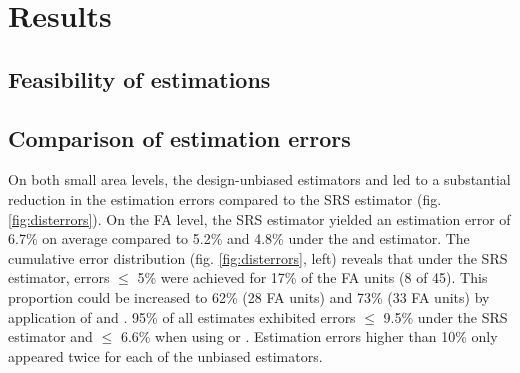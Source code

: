 \section{Results}
\label{sec:Res}

\subsection{Feasibility of estimations}
\label{sec:feasest}








%
%








\newpage
\subsection{Comparison of estimation errors}
\label{sec:esterr}

On both small area levels, the design-unbiased estimators \psmall{} and \extpsynth{} led to a substantial reduction in the estimation errors compared to the SRS estimator (fig. \ref{fig:disterrors}). On the FA level, the SRS estimator yielded an estimation error of 6.7\% on average compared to 5.2\% and 4.8\% under the \extpsynth{} and \psmall{} estimator. The cumulative error distribution (fig. \ref{fig:disterrors}, left) reveals that under the SRS estimator, errors $\leq$ 5\% were achieved for 17\% of the FA units (8 of 45). This proportion could be increased to 62\% (28 FA units) and 73\% (33 FA units) by application of \psmall{} and \extpsynth{}. 95\% of all estimates exhibited errors $\leq$ 9.5\% under the SRS estimator and $\leq$ 6.6\% when using \psmall{} or \extpsynth{}. Estimation errors higher than 10\% only appeared twice for each of the unbiased estimators.\par

